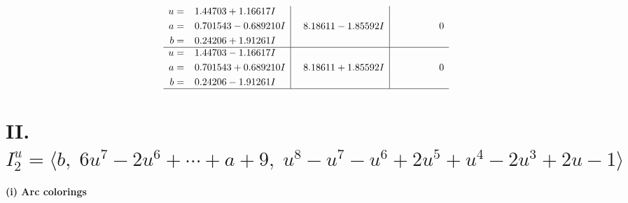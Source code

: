 \documentclass[1p]{elsarticle_modified}
\theoremstyle{definition}
\begin{document}
$$\begin{array}{c|c|c}
\begin{aligned}
u &= \phantom{-}1.44703 + 1.16617 I \\
a &= \phantom{-}0.701543 - 0.689210 I \\
b &= \phantom{-}0.24206 + 1.91261 I\end{aligned}
 & \phantom{-}8.18611 - 1.85592 I & \phantom{-0.000000 } 0 \\ \hline\begin{aligned}
u &= \phantom{-}1.44703 - 1.16617 I \\
a &= \phantom{-}0.701543 + 0.689210 I \\
b &= \phantom{-}0.24206 - 1.91261 I\end{aligned}
 & \phantom{-}8.18611 + 1.85592 I & \phantom{-0.000000 } 0\\
 \hline 
 \end{array}$$\newpage\newpage\renewcommand{\arraystretch}{1}
\centering \section*{II. $I^u_{2}= \langle b,\;6 u^7-2 u^6+\cdots+a+9,\;u^8- u^7- u^6+2 u^5+u^4-2 u^3+2 u-1 \rangle$}
\flushleft \textbf{(i) Arc colorings}\\
\end{document}
